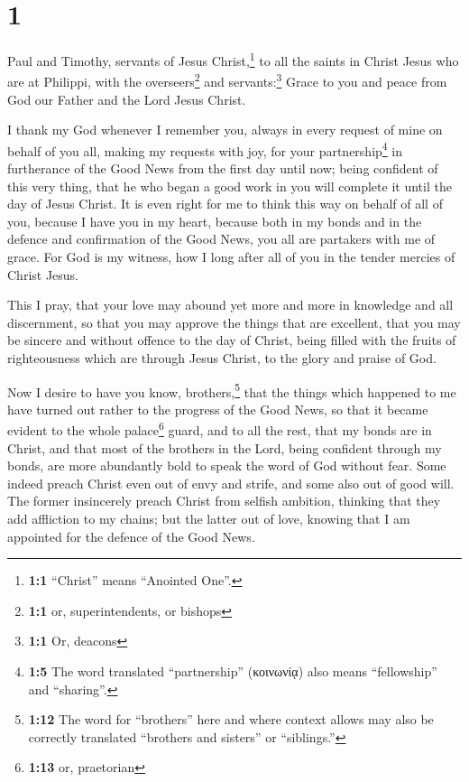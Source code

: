 \hypertarget{section}{%
\section{1}\label{section}}

 Paul and Timothy, servants of Jesus Christ,\footnote{\textbf{1:1}
  ``Christ'' means ``Anointed One''.} to all the saints in Christ Jesus
who are at Philippi, with the overseers\footnote{\textbf{1:1} or,
  superintendents, or bishops} and servants:\footnote{\textbf{1:1} Or,
  deacons}  Grace to you and peace from God our Father and
the Lord Jesus Christ.

 I thank my God whenever I remember you, 
always in every request of mine on behalf of you all, making my requests
with joy,  for your partnership\footnote{\textbf{1:5} The
  word translated ``partnership'' (κοινωνίᾳ) also means ``fellowship''
  and ``sharing''.} in furtherance of the Good News from the first day
until now;  being confident of this very thing, that he
who began a good work in you will complete it until the day of Jesus
Christ.  It is even right for me to think this way on
behalf of all of you, because I have you in my heart, because both in my
bonds and in the defence and confirmation of the Good News, you all are
partakers with me of grace.  For God is my witness, how I
long after all of you in the tender mercies of Christ Jesus.

 This I pray, that your love may abound yet more and more
in knowledge and all discernment,  so that you may
approve the things that are excellent, that you may be sincere and
without offence to the day of Christ,  being filled with
the fruits of righteousness which are through Jesus Christ, to the glory
and praise of God.

 Now I desire to have you know, brothers,\footnote{\textbf{1:12}
  The word for ``brothers'' here and where context allows may also be
  correctly translated ``brothers and sisters'' or ``siblings.''} that
the things which happened to me have turned out rather to the progress
of the Good News,  so that it became evident to the whole
palace\footnote{\textbf{1:13} or, praetorian} guard, and to all the
rest, that my bonds are in Christ,  and that most of the
brothers in the Lord, being confident through my bonds, are more
abundantly bold to speak the word of God without fear. 
Some indeed preach Christ even out of envy and strife, and some also out
of good will.  The former insincerely preach Christ from
selfish ambition, thinking that they add affliction to my chains;
 but the latter out of love, knowing that I am appointed
for the defence of the Good News.

